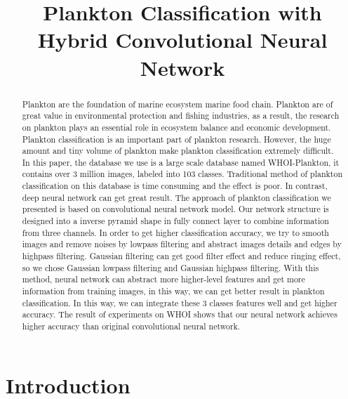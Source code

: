 \documentclass[conference]{IEEEtran}
\begin{document}
 
\title{Plankton Classification with Hybrid Convolutional Neural Network}


\author{
}


\maketitle


\begin{abstract}
Plankton are the foundation of marine ecosystem marine food chain. Plankton are of great value in environmental protection and fishing industries, as a result, the research on plankton plays an essential role in ecosystem balance and economic development. Plankton classification is an important part of plankton research. However, the huge amount and tiny volume of plankton make plankton classification extremely difficult. In this paper, the database we use is a large scale database named WHOI-Plankton, it contains over 3 million images, labeled into 103 classes. Traditional method of plankton classification on this database is time consuming and the effect is poor. In contrast, deep neural network can get great result. The approach of plankton classification we presented is based on convolutional neural network model. Our network structure is designed into a inverse pyramid shape in fully connect layer\cite{accv2016Dai} to combine information from three channels. In order to get higher classification accuracy, we try to smooth images and remove noises by lowpass filtering and abstract images details and edges by highpass filtering. Gaussian filtering can get good filter effect and reduce ringing effect, so we chose Gaussian lowpass filtering and Gaussian highpass filtering. With this method, neural network can abstract more higher-level features and get more information from training images, in this way, we can get better result in plankton classification.  In this way, we can integrate these 3 classes features well and get higher accuracy. The result of experiments on WHOI shows that our neural network achieves higher accuracy than original convolutional neural network.
\end{abstract}
\IEEEpeerreviewmaketitle


\section{Introduction}
\end{document}
